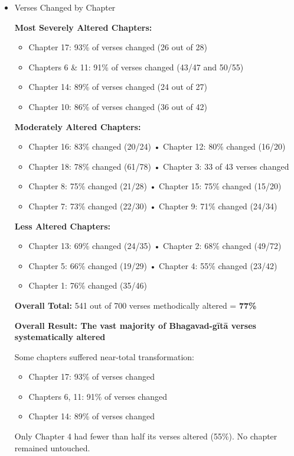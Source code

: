 \documentclass[11pt,twoside]{book}
\begin{document}
\newpage
\begin{itemize}
\item Verses Changed by Chapter
\label{sec:orgbfc6fc8}

\textbf{\textbf{Most Severely Altered Chapters:}}
\begin{itemize}
\item Chapter 17: 93\% of verses changed (26 out of 28)
\item Chapters 6 \& 11: 91\% of verses changed (43/47 and 50/55)
\item Chapter 14: 89\% of verses changed (24 out of 27)
\item Chapter 10: 86\% of verses changed (36 out of 42)
\end{itemize}

\textbf{\textbf{Moderately Altered Chapters:}}
\begin{itemize}
\item Chapter 16: 83\% changed (20/24) • Chapter 12: 80\% changed (16/20)
\item Chapter 18: 78\% changed (61/78) • Chapter 3: 33 of 43 verses changed
\item Chapter 8: 75\% changed (21/28) • Chapter 15: 75\% changed (15/20)
\item Chapter 7: 73\% changed (22/30) • Chapter 9: 71\% changed (24/34)
\end{itemize}

\textbf{\textbf{Less Altered Chapters:}}
\begin{itemize}
\item Chapter 13: 69\% changed (24/35) • Chapter 2: 68\% changed (49/72)
\item Chapter 5: 66\% changed (19/29) • Chapter 4: 55\% changed (23/42)
\item Chapter 1: 76\% changed (35/46)
\end{itemize}

\textbf{\textbf{Overall Total:}} 541 out of 700 verses methodically altered = \textbf{\textbf{77\%}}

\textbf{\textbf{\textbf{Overall Result: The vast majority of Bhagavad-gītā verses systematically altered}}}

Some chapters suffered near-total transformation:
\begin{itemize}
\item Chapter 17: 93\% of verses changed
\item Chapters 6, 11: 91\% of verses changed
\item Chapter 14: 89\% of verses changed
\end{itemize}

Only Chapter 4 had fewer than half its verses altered (55\%). No chapter remained untouched.
\end{itemize}
\end{document}
